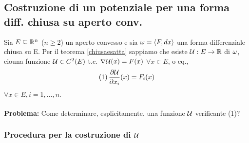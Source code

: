 \subsection{Costruzione di un potenziale per una forma diff. chiusa su aperto conv.}
Sia $E \subseteq \mathbb{R}^n$ ($n\geq 2$) un aperto convesso e sia $\omega = \left\langle F,dx \right\rangle$ una forma
differenziale chiusa su E.
Per il teorema \ref{chiusaesatta} sappiamo che esiste $\mathcal{U}:E\to\mathbb{R}$ di $\omega$, cio\ace una funzione
$\mathcal{U} \in C^2(E)$ t.c. $\nabla\mathcal{U} (x) = F(x)$ $\forall x \in E$, o eq., 
$$(1)\, \frac{\partial\mathcal{U}}{\partial x_i}(x) = F_i(x)$$
$\forall x \in E, i = 1,...,n$. \\\\
\textbf{Problema:} Come determinare, esplicitamente, una funzione $\mathcal{U}$ verificante (1)? 
\subsubsection{Procedura per la costruzione di $\mathcal{U}$}
